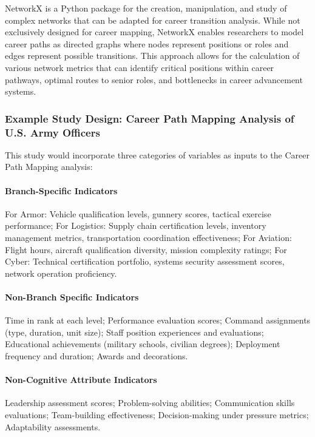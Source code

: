 \documentclass[../main.tex]{subfiles}
\begin{document}
NetworkX is a Python package for the creation, manipulation, and study of complex networks that can be adapted for career transition analysis. While not exclusively designed for career mapping, NetworkX enables researchers to model career paths as directed graphs where nodes represent positions or roles and edges represent possible transitions. This approach allows for the calculation of various network metrics that can identify critical positions within career pathways, optimal routes to senior roles, and bottlenecks in career advancement systems.

\subsubsection{Example Study Design: Career Path Mapping Analysis of U.S. Army Officers}

This study would incorporate three categories of variables as inputs to the Career Path Mapping analysis:

\paragraph{Branch-Specific Indicators}
For Armor: Vehicle qualification levels, gunnery scores, tactical exercise performance; For Logistics: Supply chain certification levels, inventory management metrics, transportation coordination effectiveness; For Aviation: Flight hours, aircraft qualification diversity, mission complexity ratings; For Cyber: Technical certification portfolio, systems security assessment scores, network operation proficiency.

\paragraph{Non-Branch Specific Indicators}
Time in rank at each level; Performance evaluation scores; Command assignments (type, duration, unit size); Staff position experiences and evaluations; Educational achievements (military schools, civilian degrees); Deployment frequency and duration; Awards and decorations.

\paragraph{Non-Cognitive Attribute Indicators}
Leadership assessment scores; Problem-solving abilities; Communication skills evaluations; Team-building effectiveness; Decision-making under pressure metrics; Adaptability assessments.
\end{document}
